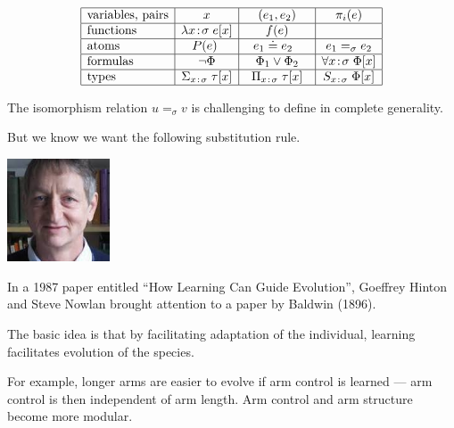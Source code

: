 {

  $$
  \begin{array}{|l|c|c|c|c|}
  \hline
    \mbox{variables, pairs} & x & (e_1,e_2) & \pi_i(e) \\ \hline 
    \mbox{functions} & \lambda \intype{x}{\sigma}\;e[x] & f(e) & \\ \hline 
    \mbox{atoms} & ~~P(e)~~~ & ~~ e_1 \doteq e_2 ~~~~ & e_1 =_\sigma e_2 \\ \hline
    \mbox{formulas} & \neg \Phi &  \Phi_1 \vee \Phi_2 & \forall \intype{x}{\sigma}\; \Phi[x] \\ \hline
    \mbox{types}   & \Sigma_{\intype{x\;}{\;\sigma}}\;\tau[x] & \Pi_{\intype{x\;}{\;\sigma}}\;\tau[x] & S_{\intype{x\;}{\;\sigma}}\;\Phi[x]  \\ \hline
  \end{array}
  $$


The isomorphism relation $u =_\sigma v$ is challenging to define in complete generality.

\vfill
But we know we want the following substitution rule.

\vfill
\centerline{
}


\includegraphics[width = 1.2in]{../images/hinton}

In a 1987 paper entitled ``How Learning Can Guide Evolution'', Goeffrey Hinton and Steve Nowlan brought attention to a paper by Baldwin (1896).

\vfill
The basic idea is that by facilitating adaptation of the individual, learning facilitates evolution of the species.

\vfill
For example, longer arms are easier to evolve if arm control is learned --- arm control is then independent of arm length.  Arm control and arm structure become more modular.

}
